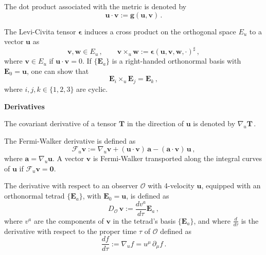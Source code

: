 \documentclass[12pt]{article}
\def\be{\begin{equation}}
\def\ee{\end{equation}}
\def\Fermi{\mathscr{F}}
\def\Obs{\mathscr{O}}
\def\crossu{\!\times_{u}\!}
\def\nablau{\nabla\!_u}
\newcommand{\mbi}[1]{\boldsymbol{#1}}    %
\begin{document}

\noindent The dot product associated with the metric is denoted by
\be
	\mbi{u}\cdot \mbi{v} := \mbi{g}(\mbi{u},\mbi{v})\,.
\ee

\noindent The Levi-Civita tensor $\mbi{\epsilon}$ induces a cross product on the orthogonal space $E_u$ to a vector $\mbi{u}$ as
\be	
	\mbi{v},\mbi{w}\in E_u\,, \quad \quad \mbi{v}\crossu \mbi{w}:=\mbi{\epsilon}(\mbi{u},\mbi{v},\mbi{w},\cdot)^{\sharp}\,,
\ee
where $\mbi{v}\in E_u$ if $\mbi u\cdot \mbi{v} = 0$. If $\{\mbi{E}_a\}$ is a right-handed orthonormal basis with $\mbi{E}_0 = \mbi{u}$, one can show that
\be
	\mbi{E}_i\crossu\mbi{E}_j = \mbi{E}_k\,,
\ee
where $i,j,k\in\{1,2,3\}$ are cyclic.


\begin{center} \bf Derivatives \end{center}
The covariant derivative of a tensor $\mbi{T}$ in the direction of $\mbi{u}$ is denoted by $\nablau\mbi{T}$\,.

\noindent The Fermi-Walker derivative is defined as
\be
	\Fermi_u\mbi{v} := \nablau \mbi{v} +  (\mbi{u}\cdot\mbi{v})\,\mbi{a} - (\mbi{a}\cdot\mbi{v})\,\mbi{u}\,,
\ee
where $\mbi{a}=\nablau\mbi{u}$. A vector $\mbi{v}$ is Fermi-Walker transported along the integral curves of $\mbi{u}$ if $\Fermi_u\mbi{v}=\mbi{0}$.

\noindent The derivative with respect to an observer $\Obs$ with 4-velocity $\mbi{u}$, equipped with an orthonormal tetrad $\{\mbi{E}_a\}$, with $\mbi{E}_0=\mbi{u}$, is defined as
\be
	D_\Obs\,\mbi{v} := \frac{dv^a}{d\tau}\mbi{E}_a\,,
\ee
where $v^a$ are the components of $\mbi{v}$ in the tetrad's basis $\{\mbi{E}_a\}$, and where $\frac{d}{d\tau}$ is the derivative with respect to the proper time $\tau$ of $\Obs$ defined as
\be
	\frac{df}{d\tau} := \nablau f= u^\mu\, \partial_\mu f\,.
\ee
\end{document}
